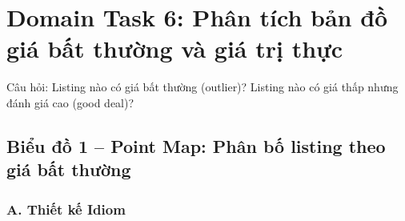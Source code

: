 \section{Domain Task 6: Phân tích bản đồ giá bất thường và giá trị thực}

Câu hỏi: Listing nào có giá bất thường (outlier)? Listing nào có giá
thấp nhưng đánh giá cao (good deal)?

\subsection{Biểu đồ 1 -- Point Map: Phân bố listing theo giá bất thường}

\subsubsection*{A. Thiết kế Idiom}

